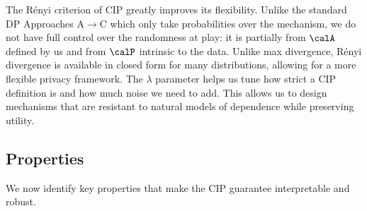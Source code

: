 The R\'enyi criterion of CIP greatly improves its flexibility. Unlike the standard DP Approaches A$\rightarrow$C which only take probabilities over the mechanism, we do not have full control over the randomness at play: it is partially from $\calA$ defined by us and from $\calP$ intrinsic to the data. Unlike max divergence, R\'enyi divergence is available in closed form for many distributions, allowing for a more flexible privacy framework. The $\lambda$ parameter helps us tune how strict a CIP definition is and how much noise we need to add. This allows us to design mechanisms that are resistant to natural models of dependence while preserving utility. 


\subsection{Properties}

We now identify key properties that make the CIP guarantee interpretable and robust. 

